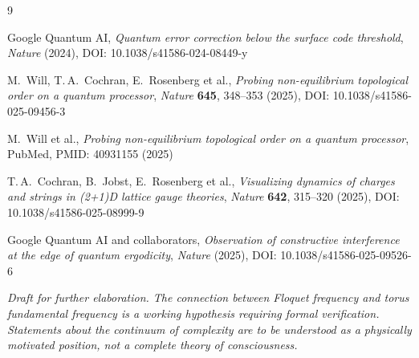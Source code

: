 \begin{thebibliography}{9}

Google Quantum AI,
\textit{Quantum error correction below the surface code threshold},
\textit{Nature} (2024), DOI: 10.1038/s41586-024-08449-y

M.~Will, T.\,A.~Cochran, E.~Rosenberg et al.,
\textit{Probing non-equilibrium topological order on a quantum processor},
\textit{Nature} \textbf{645}, 348--353 (2025),
DOI: 10.1038/s41586-025-09456-3

M.~Will et al.,
\textit{Probing non-equilibrium topological order on a quantum processor},
PubMed, PMID: 40931155 (2025)

T.\,A.~Cochran, B.~Jobst, E.~Rosenberg et al.,
\textit{Visualizing dynamics of charges and strings in (2+1)D lattice gauge theories},
\textit{Nature} \textbf{642}, 315--320 (2025),
DOI: 10.1038/s41586-025-08999-9

Google Quantum AI and collaborators,
\textit{Observation of constructive interference at the edge of quantum ergodicity},
\textit{Nature} (2025), DOI: 10.1038/s41586-025-09526-6

\end{thebibliography}

\vspace{0.5cm}
\noindent
\textit{Draft for further elaboration. The connection between Floquet frequency
and torus fundamental frequency is a working hypothesis requiring formal verification.
Statements about the continuum of complexity are to be understood as a physically
motivated position, not a complete theory of consciousness.}

